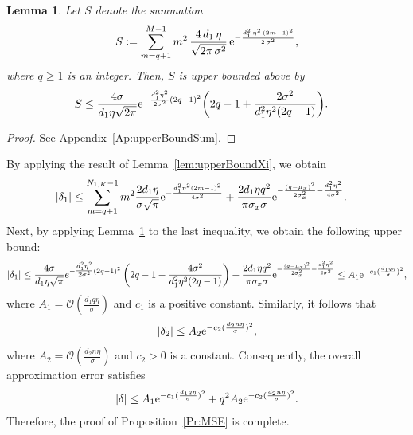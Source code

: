 \documentclass[journal,12pt,onecolumn,draftclsnofoot]{IEEEtran}
\newtheorem{lem}{Lemma}
\theoremstyle{definition}
\begin{document}
\begin{lem}
\label{lem:upperBoundSum}
Let $S$ denote the summation
\begin{align}
    S :=
 \sum_{m=q+1}^{M-1}
m^{2} \,\frac{4\,d_{1}\,\eta}{\sqrt{2\pi\,\sigma^{2}}}\,
{\rm e}^{-\frac{d_{1}^{2}\,\eta^{2}\,(2m-1)^{2}}{2\,\sigma^{2}}},
\end{align}
where \(q \ge 1\) is an integer.   Then,  $S$ is upper bounded above by
\begin{align}
\nonumber
    S & \leq \frac{4\sigma}{{d_{1}\eta}\sqrt{2\pi}}{\rm e}^{-\frac{d_{1}^{2}\eta^{2}}{2\sigma^{2}}(2q-1)^{2}}
\bigg(2q-1 + \frac{2\sigma^{2}}{{d_{1}^{2}\eta^{2}} (2q-1)} \bigg).
\end{align}
\end{lem}
\begin{proof}
    See Appendix~\ref{Ap:upperBoundSum}. 
\end{proof}
By applying the result of Lemma~\ref{lem:upperBoundXi}, we obtain
\begin{align}
|\delta_1|  & \leq \sum_{m=q+1}^{N_{1,K}-1}m^2\frac{2d_1\eta}{\sigma\sqrt{\pi}} {\rm e}^{-\frac{d_1^2\eta^2(2m-1)^2}{4\sigma^2}} +  \frac{2d_1\eta q^2 }{\pi \sigma_x\sigma}  {\rm e}^{-\frac{(q-\mu_x)^2}{2\sigma_x^2} -\frac{d_1^2\eta^2}{4\sigma^2}}.
\end{align}
Next, by applying Lemma~\ref{lem:upperBoundSum} to the last inequality, we obtain the following upper bound: 
\begin{align}
    \nonumber
    |\delta_1|  \leq \frac{4\sigma}{d_{1}\eta \sqrt{\pi}}
e^{-\tfrac{d_{1}^{2}\eta^{2}}{2\sigma^{2}}(2q - 1)^{2}}
\left( 2q - 1 + \frac{4\sigma^{2}}{d_{1}^{2}\eta^{2}(2q - 1)} \right) +  \frac{2d_1\eta q^2 }{\pi \sigma_x\sigma}  {\rm e}^{-\frac{(q-\mu_x)^2}{2\sigma_x^2} -\frac{d_1^2\eta^2}{2\sigma^2}} \leq A_1 {\rm e}^{-c_1(\frac{d_1q\eta}{\sigma})^2},
\end{align}
where $A_1= \mathcal{O}\!\left(\tfrac{d_1 q \eta}{\sigma}\right)$ and $c_1$ is a positive constant.  Similarly, it follows that
\begin{align}
    |\delta_2| \leq  A_2 {\rm e}^{-c_2(\frac{d_2n\eta}{\sigma})^2}, 
\end{align}
where $A_2 = \mathcal{O}\!\left(\tfrac{d_2 n \eta}{\sigma}\right)$ and $c_2 > 0$ is a constant.  Consequently, the overall approximation error satisfies
\begin{align}
    |\delta | \leq A_1 {\rm e}^{-c_1(\frac{d_1q\eta}{\sigma})^2}+ q^2A_2 {\rm e}^{-c_2(\frac{d_2n\eta}{\sigma})^2}.
\end{align}
Therefore, the proof of Proposition~\ref{Pr:MSE} is complete.
\end{document}
